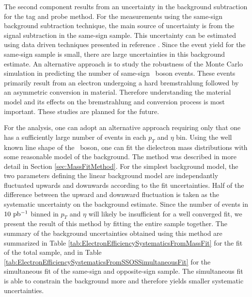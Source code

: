 \documentclass{cmspaper}
\begin{document}
The second component results from an uncertainty in the background subtraction for the tag and probe method. For the measurements using the same-sign background subtraction technique, the main source of uncertainty is from the signal subtraction in the same-sign sample. This uncertainty can be estimated using data driven techniques presented in reference \cite{SameSignNote}. Since the event yield for the same-sign sample is small, there are large uncertainties in this background estimate. An alternative approach is to study the robustness of the Monte Carlo simulation in predicting the number of same-sign \Z\ boson events. These events primarily result from an electron undergoing a hard bremstrahlung followed by an asymmetric conversion in material. Therefore understanding the material model and its effects on the bremstrahlung and conversion process is most important. These studies are planned for the future. 

For the \Z\To\Ep\Em analysis, one can adopt an alternative approach requiring only that one has a sufficiently large number of events in each $p_{T}$ and $\eta$ bin. Using the well known line shape of the \Z\ boson, one can fit the dielectron mass distributions with some reasonable model of the background. The method was described in more detail in Section \ref{sec:MassFitMethod}. For the simplest background model, the two parameters defining the linear background model are independantly fluctuated upwards and downwards according to the fit uncertainties. Half of the difference between the upward and downward fluctuation is taken as the systematic uncertainty on the background estimate. Since the number of events in $10\ \mathrm{pb^{-1}}$ binned in $p_{T}$ and $\eta$ will likely be insufficient for a well converged fit, we present the result of this method by fitting the entire sample together.  The summary of the background uncertainties obtained using this method are summarized in Table \ref{tab:ElectronEfficiencySystematicsFromMassFit} for the fit of the total sample, and in Table \ref{tab:ElectronEfficiencySystematicsFromSSOSSimultaneousFit} for the simultaneous fit of the same-sign and opposite-sign sample. The simultaneous fit is able to constrain the background more and therefore yields smaller systematic uncertainties. 
\end{document}
